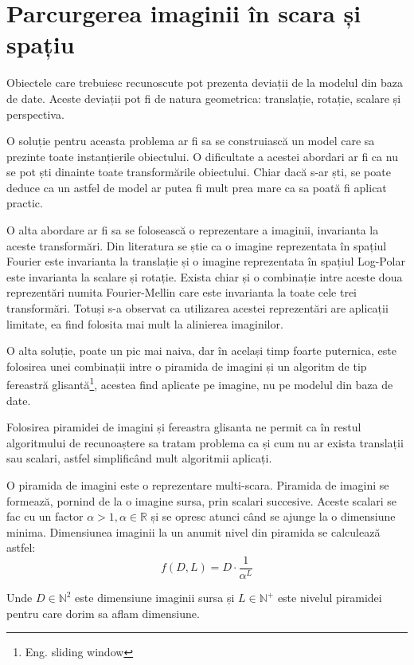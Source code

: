 \pagebreak
\section{Parcurgerea imaginii în scara și spațiu}

Obiectele care trebuiesc recunoscute pot prezenta deviații de la modelul din baza de date.
Aceste deviații pot fi de natura geometrica: translație, rotație, scalare și perspectiva.

O soluție pentru aceasta problema ar fi sa se construiască un model care sa prezinte toate instanțierile obiectului.
O dificultate a acestei abordari ar fi ca nu se pot ști dinainte toate transformările obiectului.
Chiar dacă s-ar ști, se poate deduce ca un astfel de model ar putea fi mult prea mare ca sa poată fi aplicat practic.

O alta abordare ar fi sa se folosească o reprezentare a imaginii, invarianta la aceste transformări.
Din literatura se știe ca o imagine reprezentata în spațiul Fourier este invarianta la translație și o imagine reprezentata în spațiul Log-Polar este invarianta la scalare și rotație.\cite{treiber2010introduction}
Exista chiar și o combinație intre aceste doua reprezentări numita Fourier-Mellin care este invarianta la toate cele trei transformări.
Totuși s-a observat ca utilizarea acestei reprezentări are aplicații limitate, ea find folosita mai mult la alinierea imaginilor.\cite{treiber2010introduction}

O alta soluție, poate un pic mai naiva, dar în același timp foarte puternica, este folosirea unei combinații intre o piramida de imagini și un algoritm de tip fereastră glisantă\footnote{Eng. sliding window}, acestea find aplicate pe imagine, nu pe modelul din baza de date.

Folosirea piramidei de imagini și fereastra glisanta ne permit ca în restul algoritmului de recunoaștere sa tratam problema ca și cum nu ar exista translații sau scalari, astfel simplificând mult algoritmii aplicați.

O piramida de imagini este o reprezentare multi-scara.
Piramida de imagini se formează, pornind de la o imagine sursa, prin scalari succesive.
Aceste scalari se fac cu un factor ${\alpha > 1, \alpha \in \mathbb{R}}$ și se opresc atunci când se ajunge la o dimensiune minima.
Dimensiunea imaginii la un anumit nivel din piramida se calculează astfel:
$${
f(D,L) = D \cdot \frac{1}{\alpha^L}
}$$

Unde ${D \in \mathbb{N}^2}$ este dimensiune imaginii sursa și ${L \in \mathbb{N}^+}$ este nivelul piramidei pentru care dorim sa aflam dimensiune.

